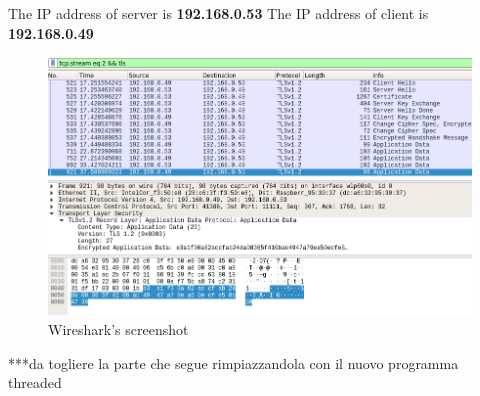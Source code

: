 \documentclass[a4paper,12pt]{article}
\begin{document}
The IP address of server is \textbf{192.168.0.53}
The IP address of client is \textbf{192.168.0.49}
\begin{figure}[H]
    \centering
    \includegraphics[scale=0.5]{./code/img/wireshark-iterative.png}
    \caption{Wireshark's screenshot}
    
\end{figure}
***da togliere la parte che segue rimpiazzandola con il nuovo programma threaded
\end{document}
